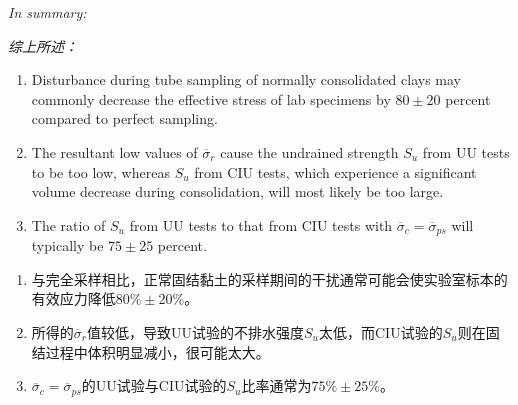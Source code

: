 \begin{paracol}{2}
    \emph{In summary:} 

    \switchcolumn

    \emph{综上所述：}

    \switchcolumn*

    \begin{enumerate}
        \item Disturbance during tube sampling of normally consolidated clays may commonly decrease the effective stress of lab specimens by $80\pm{}20$ percent compared to perfect sampling.
        \item The resultant low values of $\overline{\sigma}_r$ cause the undrained strength $S_u$ from UU tests to be too low, whereas $S_u$ from CIU tests, which experience a significant volume decrease during consolidation, will most likely be too large.
        \item The ratio of $S_u$ from UU tests to that from CIU tests with $\overline{\sigma}_c=\overline{\sigma}_{ps}$ will typically be $75\pm{}25$ percent.
    \end{enumerate}

    \switchcolumn

    \begin{enumerate}
        \item 与完全采样相比，正常固结黏土的采样期间的干扰通常可能会使实验室标本的有效应力降低$80\%\pm{}20\%$。
        \item 所得的$\overline{\sigma}_r$值较低，导致UU试验的不排水强度$S_u$太低，而CIU试验的$S_u$则在固结过程中体积明显减小，很可能太大。
        \item $\overline{\sigma}_c=\overline{\sigma}_{ps}$的UU试验与CIU试验的$S_u$比率通常为$75\%\pm{}25\%$。
    \end{enumerate}

\end{paracol}